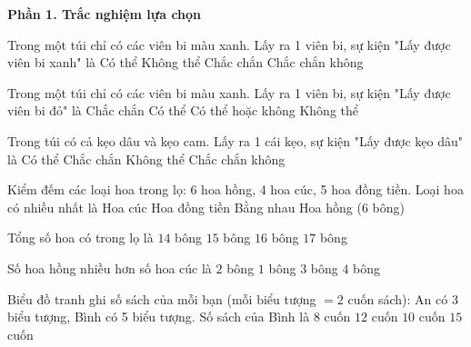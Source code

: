 \textbf{Phần 1. Trắc nghiệm lựa chọn}

\begin{ex} %
Trong một túi chỉ có các viên bi màu xanh. Lấy ra 1 viên bi, sự kiện "Lấy được viên bi xanh" là
\choice
{Có thể}
{Không thể}
{\True Chắc chắn}
{Chắc chắn không}
\end{ex}

\begin{ex} %
Trong một túi chỉ có các viên bi màu xanh. Lấy ra 1 viên bi, sự kiện "Lấy được viên bi đỏ" là
\choice
{Chắc chắn}
{Có thể}
{Có thể hoặc không}
{\True Không thể}
\end{ex}

\begin{ex} %
Trong túi có cả kẹo dâu và kẹo cam. Lấy ra 1 cái kẹo, sự kiện "Lấy được kẹo dâu" là
\choice
{\True Có thể}
{Chắc chắn}
{Không thể}
{Chắc chắn không}
\end{ex}

\begin{ex} %
Kiểm đếm các loại hoa trong lọ: 6 hoa hồng, 4 hoa cúc, 5 hoa đồng tiền. Loại hoa có nhiều nhất là
\choice
{Hoa cúc}
{Hoa đồng tiền}
{Bằng nhau}
{\True Hoa hồng ($6$ bông)}
\end{ex}

\begin{ex} %
Tổng số hoa có trong lọ là
\choice
{$14$ bông}
{\True $15$ bông}
{$16$ bông}
{$17$ bông}
\end{ex}

\begin{ex} %
Số hoa hồng nhiều hơn số hoa cúc là
\choice
{\True $2$ bông}
{$1$ bông}
{$3$ bông}
{$4$ bông}
\end{ex}

\begin{ex} %
Biểu đồ tranh ghi số sách của mỗi bạn (mỗi biểu tượng $= 2$ cuốn sách): An có 3 biểu tượng, Bình có 5 biểu tượng. Số sách của Bình là
\choice
{$8$ cuốn}
{$12$ cuốn}
{\True $10$ cuốn}
{$15$ cuốn}
\end{ex}

